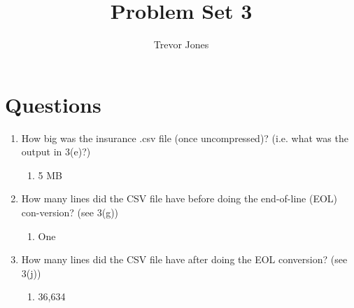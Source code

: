 \documentclass{article}
\title{Problem Set 3}
\author{Trevor Jones}
\begin{document}
\maketitle

\section{Questions}
\begin{enumerate}
    \item How big was the insurance .csv file (once uncompressed)? (i.e. what was the output in 3(e)?)
    \begin{enumerate}
        \item 5 MB
    \end{enumerate}
    \item How many lines did the CSV file have before doing the end-of-line (EOL) con-version? (see 3(g))
    \begin{enumerate}
        \item One
    \end{enumerate}
    \item How many lines did the CSV file have after doing the EOL conversion? (see 3(j))
    \begin{enumerate}
        \item 36,634
    \end{enumerate}
\end{enumerate}
\end{document}
